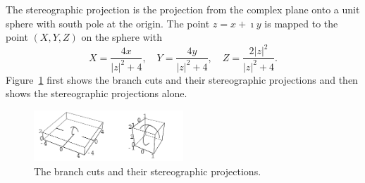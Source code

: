 {\begin{Solution}
  The stereographic projection is the projection from the complex plane 
  onto a unit sphere with south pole at the origin.  The point $z = x + \imath y$
  is mapped to the point $(X,Y,Z)$ on the sphere with
  \[
  X = \frac{4 x}{|z|^2 + 4}, \quad
  Y = \frac{4 y}{|z|^2 + 4}, \quad
  Z = \frac{2 |z|^2}{|z|^2 + 4}.
  \]
  Figure~\ref{figure bp-stereographic-z3z26z12} first shows the branch
  cuts and their stereographic projections and then shows the stereographic
  projections alone.
  \begin{figure}[htbp!]
    \begin{center}
      \includegraphics[width=0.5\textwidth]{fcv/function/bp-stereographic-z3z26z12}
    \end{center}
    \caption{The branch cuts and their stereographic projections.}
    \label{figure bp-stereographic-z3z26z12}
  \end{figure}
\end{Solution}
}







